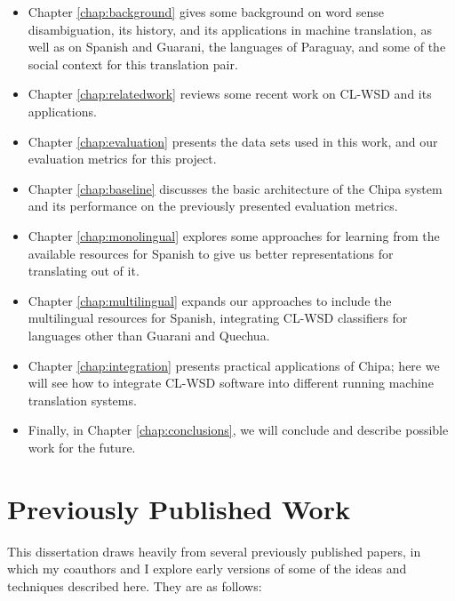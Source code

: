 \begin{itemize}
\item Chapter \ref{chap:background} gives some background on word sense
disambiguation, its history, and its applications in machine translation, as
well as on Spanish and Guarani, the languages of Paraguay, and some of the
social context for this translation pair.
\item Chapter \ref{chap:relatedwork} reviews some recent work on CL-WSD and its
applications.
\item Chapter \ref{chap:evaluation} presents the data sets used in this work,
and our evaluation metrics for this project.
\item Chapter \ref{chap:baseline} discusses the basic architecture of the
Chipa system and its performance on the previously presented evaluation metrics.
\item Chapter \ref{chap:monolingual} explores some approaches for learning from
the available resources for Spanish to give us better representations for
translating out of it.
\item Chapter \ref{chap:multilingual} expands our approaches to include the
multilingual resources for Spanish, integrating CL-WSD classifiers for
languages other than Guarani and Quechua.
\item Chapter \ref{chap:integration} presents practical applications of Chipa;
here we will see how to integrate CL-WSD software into different running
machine translation systems.
\item Finally, in Chapter \ref{chap:conclusions}, we will conclude and describe
possible work for the future.
\end{itemize}

\section{Previously Published Work}
This dissertation draws heavily from several previously published papers, in
which my coauthors and I explore early versions of some of the ideas and
techniques described here. They are as follows:

